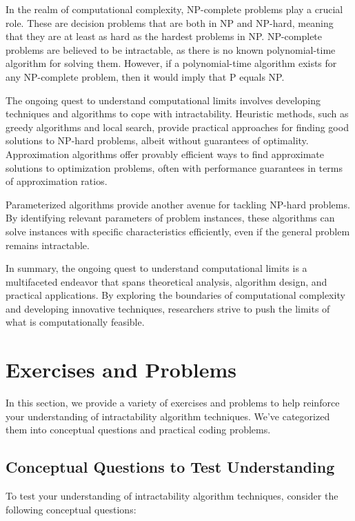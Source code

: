 \documentclass[12pt]{book} %
\begin{document}
In the realm of computational complexity, NP-complete problems play a crucial role. These are decision problems that are both in NP and NP-hard, meaning that they are at least as hard as the hardest problems in NP. NP-complete problems are believed to be intractable, as there is no known polynomial-time algorithm for solving them. However, if a polynomial-time algorithm exists for any NP-complete problem, then it would imply that P equals NP.

The ongoing quest to understand computational limits involves developing techniques and algorithms to cope with intractability. Heuristic methods, such as greedy algorithms and local search, provide practical approaches for finding good solutions to NP-hard problems, albeit without guarantees of optimality. Approximation algorithms offer provably efficient ways to find approximate solutions to optimization problems, often with performance guarantees in terms of approximation ratios.

Parameterized algorithms provide another avenue for tackling NP-hard problems. By identifying relevant parameters of problem instances, these algorithms can solve instances with specific characteristics efficiently, even if the general problem remains intractable.

In summary, the ongoing quest to understand computational limits is a multifaceted endeavor that spans theoretical analysis, algorithm design, and practical applications. By exploring the boundaries of computational complexity and developing innovative techniques, researchers strive to push the limits of what is computationally feasible.


\section{Exercises and Problems}

In this section, we provide a variety of exercises and problems to help reinforce your understanding of intractability algorithm techniques. We've categorized them into conceptual questions and practical coding problems.

\subsection{Conceptual Questions to Test Understanding}

To test your understanding of intractability algorithm techniques, consider the following conceptual questions:
\end{document}
